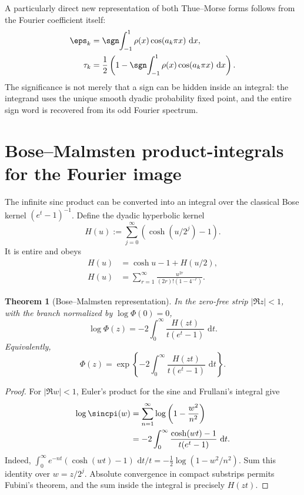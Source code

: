 \documentclass[11pt,oneside]{article}
\newtheorem{theorem}{Theorem}[section]
\theoremstyle{definition}
\newcommand{\dd}{\,\mathrm d}
\begin{document}
A particularly direct new representation of both Thue--Morse forms follows from the
Fourier coefficient itself:
\begin{align}
 \eps_k
 &=\sgn\!\int_{-1}^{1}\rho(x)\cos(a_k\pi x)\,\dd x,       \label{p3:eq:tm-up-integral-sign}\\
 \tau_k
 &=\frac12\left(1-
 \sgn\!\int_{-1}^{1}\rho(x)\cos(a_k\pi x)\,\dd x\right). \label{p3:eq:tm-up-integral-bit}
\end{align}
The significance is not merely that a sign can be hidden inside an integral: the integrand
uses the unique smooth dyadic probability fixed point, and the entire sign word is recovered
from its odd Fourier spectrum.

\section{Bose--Malmsten product-integrals for the Fourier image}
\label{p3:sec:malmsten}

The infinite sinc product can be converted into an integral over the classical Bose kernel
\((e^t-1)^{-1}\).  Define the dyadic hyperbolic kernel
\begin{equation}
 H(u):=\sum_{j=0}^{\infty}\left(\cosh(u/2^j)-1\right).      \label{p3:eq:H-kernel}
\end{equation}
It is entire and obeys
\begin{align}
 H(u)&=\cosh u-1+H(u/2),                                   \label{p3:eq:H-refine}\\
 H(u)&=\sum_{r=1}^{\infty}
       \frac{u^{2r}}{(2r)!(1-4^{-r})}.                     \label{p3:eq:H-power}
\end{align}

\begin{theorem}[Bose--Malmsten representation]
\label{p3:thm:malmsten}
In the zero-free strip \(|\Re z|<1\), with the branch normalized by
\(\log\Phi(0)=0\),
\begin{equation}
\boxed{
 \log\Phi(z)
 =-2\int_0^\infty
   \frac{H(zt)}{t(e^t-1)}\,\dd t.}                         \label{p3:eq:logPhi-malmsten}
\end{equation}
Equivalently,
\begin{equation}
\boxed{
 \Phi(z)=\exp\!\left\{-2\int_0^\infty
   \frac{H(zt)}{t(e^t-1)}\,\dd t\right\}.}               \label{p3:eq:Phi-product-integral}
\end{equation}
\end{theorem}

\begin{proof}
For \(|\Re w|<1\), Euler's product for the sine and Frullani's integral give
\begin{align*}
 \log\sincpi(w)
 &=\sum_{n=1}^{\infty}\log\left(1-\frac{w^2}{n^2}\right)\\
 &=-2\int_0^\infty
   \frac{\cosh(wt)-1}{t(e^t-1)}\,\dd t.
\end{align*}
Indeed,
\(
 \int_0^\infty e^{-nt}(\cosh(wt)-1)\,\dd t/t
 =-\tfrac12\log(1-w^2/n^2)
\).
Sum this identity over \(w=z/2^j\).  Absolute convergence in compact
substrips permits Fubini's theorem, and the sum inside the integral is precisely
\(H(zt)\).
\end{proof}
\end{document}
